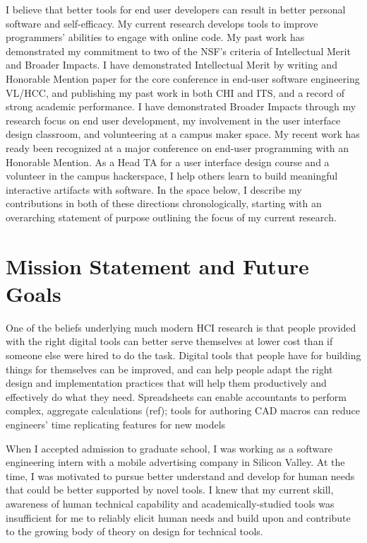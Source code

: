 \documentclass[12pt]{memoir}
\title{}
\author{Andrew Head}
\begin{document}


I believe that better tools for end user developers can result in better personal software and self-efficacy.
My current research develops tools to improve programmers' abilities to engage with online code.
My past work has demonstrated my commitment to two of the NSF's criteria of Intellectual Merit and Broader Impacts.
I have demonstrated Intellectual Merit by writing and Honorable Mention paper for the core conference in end-user software engineering VL/HCC, and publishing my past work in both CHI and ITS, and a record of strong academic performance.
I have demonstrated Broader Impacts through my research focus on end user development, my involvement in the user interface design classroom, and volunteering at a campus maker space.
\fi
My recent work has ready been recognized at a major conference on end-user programming with an Honorable Mention.
As a Head TA for a user interface design course and a volunteer in the campus hackerspace, I help others learn to build meaningful interactive artifacts with software.
In the space below, I describe my contributions in both of these directions chronologically, starting with an overarching statement of purpose outlining the focus of my current research.

\section{Mission Statement and Future Goals}

One of the beliefs underlying much modern HCI research is that people provided with the right digital tools can better serve themselves at lower cost than if someone else were hired to do the task.
Digital tools that people have for building things for themselves can be improved, and can help people adapt the right design and implementation practices that will help them productively and effectively do what they need.
Spreadsheets can enable accountants to perform complex, aggregate calculations (ref); tools for authoring CAD macros can reduce engineers' time replicating features for new models

When I accepted admission to graduate school, I was working as a software engineering intern with a mobile advertising company in Silicon Valley.
At the time, I was motivated to pursue better understand and develop for human needs that could be better supported by novel tools.
I knew that my current skill, awareness of human technical capability and academically-studied tools was insufficient for me to reliably elicit human needs and build upon and contribute to the growing body of theory on design for technical tools.
\end{document}
